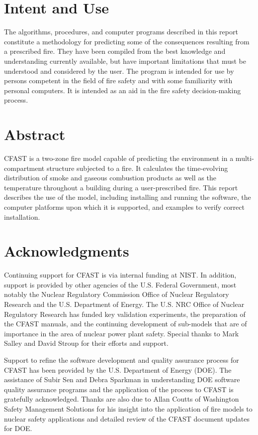 \documentclass[12pt]{book}
\begin{document}

\chapter{Intent and Use}

The algorithms, procedures, and computer programs described in this report constitute a
methodology for predicting some of the consequences resulting from a prescribed fire.  They
have been compiled from the best knowledge and understanding currently available, but have
important limitations that must be understood and considered by the user.  The program is
intended for use by persons competent in the field of fire safety and with some familiarity with
personal computers. It is intended as an aid in the fire safety decision-making process.

\chapter{Abstract}

CFAST is a two-zone fire model capable of predicting the environment in a multi-compartment structure subjected to a fire. It calculates the time-evolving distribution of smoke and gaseous combustion products as well as the temperature throughout a building during a user-prescribed fire. This report describes the use of the model, including installing and running the software, the computer platforms upon which it is supported, and examples to verify correct installation.

\chapter{Acknowledgments}

\label{acksection}

Continuing support for CFAST is via internal funding at NIST. In addition, support is provided by other agencies of the U.S. Federal Government, most notably the Nuclear Regulatory Commission Office of Nuclear Regulatory Research and the U.S. Department of Energy. The U.S. NRC Office of Nuclear Regulatory Research has funded key validation experiments, the preparation of the CFAST manuals, and the continuing development of sub-models that are of importance in the area of nuclear power plant safety. Special thanks to Mark Salley and David Stroup for their efforts and support.

Support to refine the software development and quality assurance process for CFAST has been provided by the U.S. Department of Energy (DOE). The assistance of Subir Sen and Debra Sparkman in understanding DOE software quality assurance programs and the application of the process to CFAST is gratefully acknowledged. Thanks are also due to Allan Coutts of Washington Safety Management Solutions for his insight into the application of fire models to nuclear safety applications and detailed review of the CFAST document updates for DOE.
\end{document}
